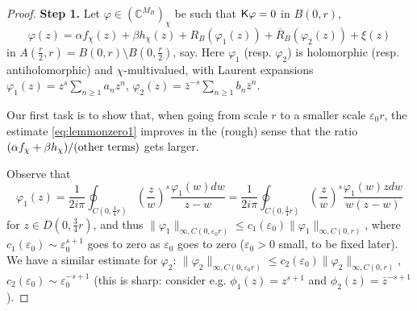 \documentclass[10pt]{article}
\newcommand{\C}{\mathbb{C}}
\newcommand{\eps}{\varepsilon}
\newcommand{\rK}{{\sf K}}
\begin{document}
\begin{proof}
{\bf Step 1.}  Let $\varphi\in(\C^{M_B})_\chi$ be such that $\rK\varphi=0$ in $B(0,r)$,
\begin{equation}\label{eq:lemmonzero1}
\varphi(z)=\alpha f_\chi(z)+\beta h_\chi(z)+R_B(\varphi_1(z))+{\overline R_B}(\varphi_2(z))+\xi(z)
\end{equation}
in $A(\frac r2,r)=B(0,r)\setminus B(0,\frac r2)$, say. Here $\varphi_1$ (resp. $\varphi_2$) is holomorphic (resp. antiholomorphic) and $\chi$-multivalued, with Laurent expansions $\varphi_1(z)=z^s\sum_{n\geq 1}a_n z^n$, $\varphi_2(z)=\bar z^{-s}\sum_{n\geq 1}b_n \bar z^n$. 

Our first task is to show that, when going from scale $r$ to a smaller scale $\eps_0r$, the estimate \eqref{eq:lemmonzero1} improves in the (rough) sense that the ratio $(\alpha f_\chi+\beta h_\chi)/({\rm other\ terms})$ gets larger.

Observe
that
$$\varphi_1(z)=\frac 1{2i\pi}\oint_{C(0,\frac 34 r)}\left(\frac zw\right)^s\frac{\varphi_1(w)dw}{z-w}=\frac 1{2i\pi}\oint_{C(0,\frac 34 r)}\left(\frac zw\right)^s\frac{\varphi_1(w)zdw}{w(z-w)}$$
for $z\in D(0,\frac 34 r)$, and thus $\|\varphi_1\|_{\infty,C(0,\eps_0r)}\leq c_1(\eps_0)\|\varphi_1\|_{\infty,C(0,r)}$, where $c_1(\eps_0)\sim\eps_0^{s+1}$ goes to zero as $\eps_0$ goes to zero ($\eps_0>0$ small, to be fixed later). We have a similar estimate for $\varphi_2$: $\|\varphi_2\|_{\infty,C(0,\eps_0r)}\leq c_2(\eps_0)\|\varphi_2\|_{\infty,C(0,r)}$, $c_2(\eps_0)\sim\eps_0^{-s+1}$ (this is sharp: consider e.g. $\phi_1(z)=z^{s+1}$ and $\phi_2(z)=\bar z^{-s+1}$).


\end{proof}
\end{document}
